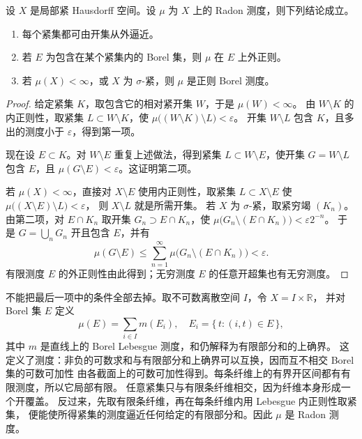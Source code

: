 \begin{proposition}\label{b1:prop:radon-outer-regularity}
设 \(X\) 是局部紧 Hausdorff 空间。设 \(\mu\) 为 \(X\) 上的 Radon 测度，则下列结论成立。
\begin{enumerate}
\item\label{b1:item:radon-outer-compact}每个紧集都可由开集从外逼近。
\item\label{b1:item:radon-outer-local}若 \(E\) 为包含在某个紧集内的 Borel 集，则 \(\mu\) 在 \(E\) 上外正则。
\item\label{b1:item:radon-outer-finite}若 \(\mu(X)<\infty\)，或 \(X\) 为 \(\sigma\)-紧，则 \(\mu\) 是正则 Borel 测度。
\end{enumerate}
\end{proposition}
\begin{proof}
给定紧集 \(K\)，取包含它的相对紧开集 \(W\)，于是 \(\mu(W)<\infty\)。
由 \(W\setminus K\) 的内正则性，取紧集 \(L\subset W\setminus K\)，使
\(\mu\bigl((W\setminus K)\setminus L\bigr)<\varepsilon\)。
开集 \(W\setminus L\) 包含 \(K\)，且多出的测度小于 \(\varepsilon\)，得到第一项。

现在设 \(E\subset K\)。对 \(W\setminus E\) 重复上述做法，得到紧集
\(L\subset W\setminus E\)，使开集 \(G=W\setminus L\) 包含 \(E\)，且
\(\mu(G\setminus E)<\varepsilon\)。这证明第二项。

若 \(\mu(X)<\infty\)，直接对 \(X\setminus E\) 使用内正则性，取紧集
\(L\subset X\setminus E\) 使 \(\mu\bigl((X\setminus E)\setminus L\bigr)<\varepsilon\)，
则 \(X\setminus L\) 就是所需开集。
若 \(X\) 为 \(\sigma\)-紧，取紧穷竭 \((K_n)\)。由第二项，对 \(E\cap K_n\)
取开集 \(G_n\supset E\cap K_n\)，使
\(\mu\bigl(G_n\setminus(E\cap K_n)\bigr)<\varepsilon2^{-n}\)。
于是 \(G=\bigcup_nG_n\) 开且包含 \(E\)，并有
\[
 \mu(G\setminus E)
 \leq\sum_{n=1}^\infty\mu\bigl(G_n\setminus(E\cap K_n)\bigr)<\varepsilon.
\]
有限测度 \(E\) 的外正则性由此得到；无穷测度 \(E\) 的任意开超集也有无穷测度。
\end{proof}

不能把最后一项中的条件全部去掉。取不可数离散空间 \(I\)，令 \(X=I\times\mathbb R\)，
并对 Borel 集 \(E\) 定义
\[
 \mu(E)=\sum_{i\in I}m(E_i),\quad E_i=\{\,t:(i,t)\in E\,\},
\]
其中 \(m\) 是直线上的 Borel Lebesgue 测度，和仍解释为有限部分和的上确界。
这定义了测度：非负的可数求和与有限部分和上确界可以互换，因而互不相交 Borel 集的可数可加性
由各截面上的可数可加性得到。每条纤维上的有界开区间都有有限测度，所以它局部有限。
任意紧集只与有限条纤维相交，因为纤维本身形成一个开覆盖。
反过来，先取有限条纤维，再在每条纤维内用 Lebesgue 内正则性取紧集，
便能使所得紧集的测度逼近任何给定的有限部分和。因此 \(\mu\) 是 Radon 测度。

